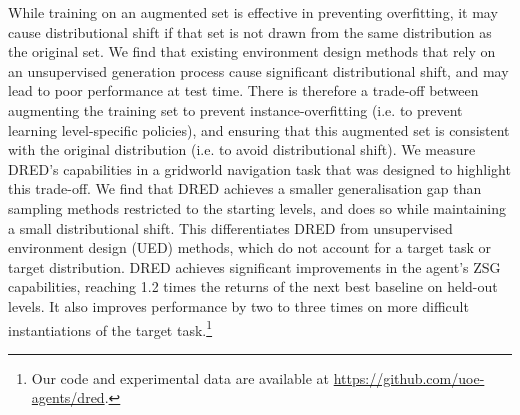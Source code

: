 \documentclass{article}
\theoremstyle{plain}
\theoremstyle{definition}
\theoremstyle{remark}
\begin{document}
While training on an augmented set is effective in preventing overfitting, it may cause distributional shift if that set is not drawn from the same distribution as the original set. We find that existing environment design methods that rely on an unsupervised generation process cause significant distributional shift, and may lead to poor performance at test time. There is therefore a trade-off between augmenting the training set to prevent instance-overfitting (i.e. to prevent learning level-specific policies), and ensuring that this augmented set is consistent with the original distribution (i.e. to avoid distributional shift). We measure DRED's capabilities in a gridworld navigation task that was designed to highlight this trade-off. We find that DRED achieves a smaller generalisation gap than sampling methods restricted to the starting levels, and does so while maintaining a small distributional shift. This differentiates DRED from unsupervised environment design (UED) methods, which do not account for a target task or target distribution. DRED achieves significant improvements in the agent's ZSG capabilities, reaching 1.2 times the returns of the next best baseline on held-out levels. It also improves performance by two to three times on more difficult instantiations of the target task.\footnote{Our code and experimental data are available at \url{https://github.com/uoe-agents/dred}.} %

\end{document}
